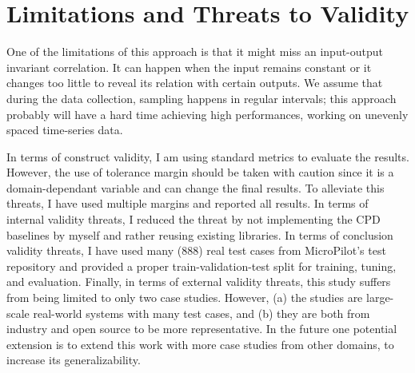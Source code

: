 \section{Limitations and Threats to Validity} \label{sec:threats_to_validity}
One of the limitations of this approach is that it might miss an input-output invariant correlation. It can happen when the input remains constant or it changes too little to reveal its relation with certain outputs. 
We assume that during the data collection, sampling happens in regular intervals; this approach probably will have a hard time achieving high performances, working on unevenly spaced time-series data.

In terms of construct validity, I am using standard metrics to evaluate the results. However, the use of tolerance margin should be taken with caution since it is a domain-dependant variable and can change the final results. To alleviate this threats, I have used multiple margins and reported all results. In terms of internal validity threats, I reduced the threat by not implementing the CPD baselines by myself and rather reusing existing libraries. In terms of conclusion validity threats, I have used many (888) real test cases from MicroPilot's test repository and provided a proper train-validation-test split for training, tuning, and evaluation. Finally, in terms of external validity threats, this study suffers from being limited to only two case studies. However, (a) the studies are large-scale real-world systems with many test cases, and (b) they are both from industry and open source to be more representative. In the future one potential extension is to extend this work with more case studies from other domains, to increase its generalizability.


